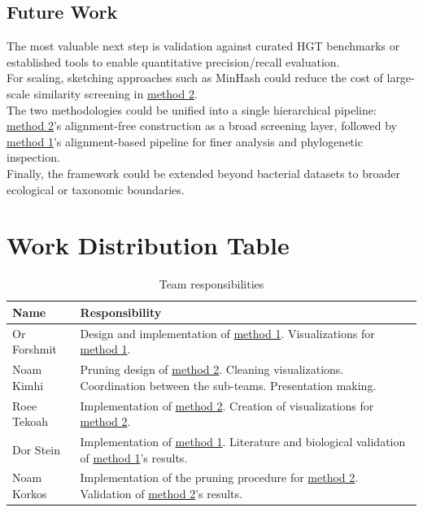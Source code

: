 \documentclass[11pt]{article}
\begin{document}
	\subsection{Future Work}
	The most valuable next step is validation against curated HGT benchmarks or established tools to enable quantitative precision/recall evaluation.\\
	For scaling, sketching approaches such as MinHash \cite{Ondov2016} could reduce the cost of large-scale similarity screening in \hyperref[subsec:method2]{method 2}.\\
	The two methodologies could be unified into a single hierarchical pipeline: \hyperref[subsec:method2]{method 2}'s alignment-free construction as a broad screening layer, followed by \hyperref[subsec:method1]{method 1}'s alignment-based pipeline for finer analysis and phylogenetic inspection.\\
	Finally, the framework could be extended beyond bacterial datasets to broader ecological or taxonomic boundaries.
	
	\section{Work Distribution Table}
	\begin{table}[H]
		\centering
		\renewcommand{\arraystretch}{1.3}
		\begin{tabularx}{\textwidth}{lX}
			\toprule
			\textbf{Name} & \textbf{Responsibility} \\
			\midrule
			Or Forshmit & Design and implementation of \hyperref[subsec:method1]{method 1}. Visualizations for \hyperref[subsec:method1]{method 1}.\\
			Noam Kimhi & Pruning design of \hyperref[subsec:method2]{method 2}. Cleaning visualizations. Coordination between the sub-teams. Presentation making. \\
			Roee Tekoah & Implementation of \hyperref[subsec:method2]{method 2}.  Creation of visualizations for \hyperref[subsec:method2]{method 2}.\\
			Dor Stein & Implementation of \hyperref[subsec:method1]{method 1}. Literature and biological validation of \hyperref[subsec:method1]{method 1}'s results. \\
			Noam Korkos & Implementation of the pruning procedure for \hyperref[subsec:method2]{method 2}. Validation of \hyperref[subsec:method2]{method 2}'s results. \\
			\bottomrule
		\end{tabularx}
		\caption{Team responsibilities}
		\label{tab:example}
	\end{table}
	
	
	\newpage
	
	
	
	
	
\end{document}
